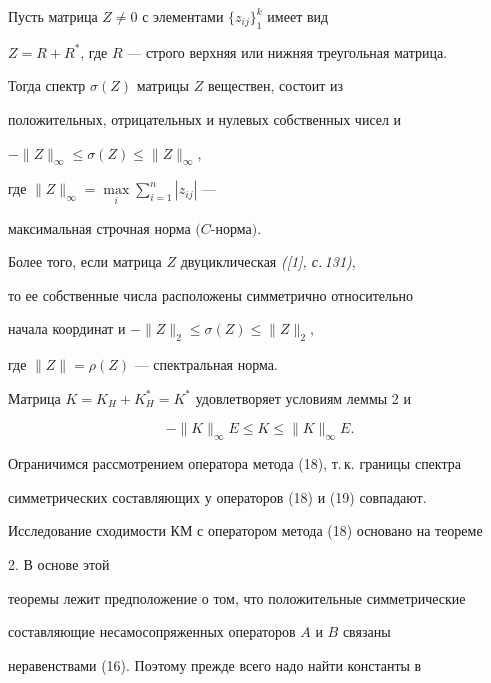 \begin{lem} 


Пусть матрица $Z\ne0$ с элементами $\{z_{ij}\}^k_1$ имеет вид 


$Z=R+R^*$, где $R$ --- строго верхняя или нижняя треугольная матрица. 


Тогда спектр $\sigma(Z)$ матрицы $Z$ веществен, состоит из 


положительных, отрицательных и нулевых собственных чисел и 


$-\|Z\|_\infty\le\sigma(Z)\le\|Z\|_\infty$, 


где $\|Z\|_\infty=\max\limits_i\sum\limits^n_{i=1}|z_{ij}|$ --- 


максимальная строчная норма $(C$-норма$)$. 


 


Более того, если матрица $Z$ двуциклическая {\em ([1], с.\,131)}, 


то ее собственные числа расположены симметрично относительно 


начала координат и $-\|Z\|_2\le\sigma(Z)\le\|Z\|_2$, 


где $\|Z\|=\rho(Z)$ --- спектральная норма. 


\end{lem} 


 


Матрица $K=K_H+K^*_H=K^*$ удовлетворяет условиям леммы 2 и 


\begin{equation} 


-\|K\|_\infty E\le K\le \|K\|_\infty E. 


\end{equation} 


 


Ограничимся рассмотрением оператора метода (18), т.\,к. границы спектра 


симметрических составляющих у операторов (18) и (19) совпадают. 


Исследование сходимости КМ с оператором метода (18) основано на теореме 


2. В основе этой 


теоремы лежит предположение о том, что положительные симметрические 


составляющие несамосопряженных операторов $A$ и $B$ связаны 


неравенствами (16). Поэтому прежде всего надо найти константы в 


